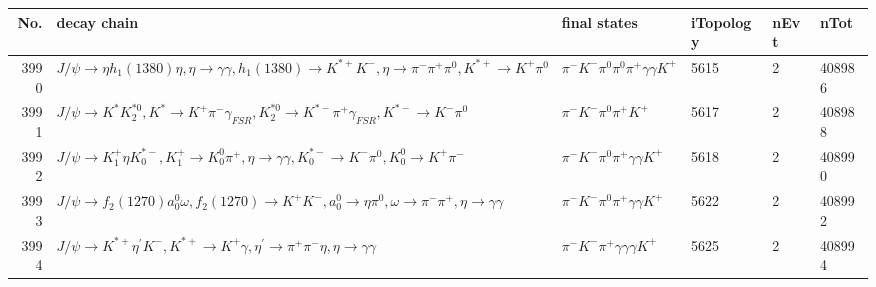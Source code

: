 \begin{table}[htbp] 
\begin{center}
\begin{small}
\begin{tabular}{rlllll}\hline\hline
 No. & decay chain & final states &  iTopology & nEvt & nTot \\\hline
3990&$J/\psi       \rightarrow \eta          h_{1}(1380)    \eta          , \eta           \rightarrow \gamma       \gamma       , h_{1}(1380)     \rightarrow K^{*+}         K^{-}          , \eta           \rightarrow \pi^{-}        \pi^{+}        \pi^{0}        , K^{*+}          \rightarrow K^{+}          \pi^{0}        $&$\pi^{-}        K^{-}          \pi^{0}        \pi^{0}        \pi^{+}        \gamma       \gamma       K^{+}          $& 5615&    2&408986\\
3991&$J/\psi       \rightarrow K^{*}          K_2^{*0}       , K^{*}           \rightarrow K^{+}          \pi^{-}        \gamma_{FSR} , K_2^{*0}        \rightarrow K^{*-}         \pi^{+}        \gamma_{FSR} , K^{*-}          \rightarrow K^{-}          \pi^{0}        $&$\pi^{-}        K^{-}          \pi^{0}        \pi^{+}        K^{+}          $& 5617&    2&408988\\
3992&$J/\psi       \rightarrow K_1^{+}        \eta          K_{0}^{*-}     , K_1^{+}         \rightarrow K_0^{0}        \pi^{+}        , \eta           \rightarrow \gamma       \gamma       , K_{0}^{*-}      \rightarrow K^{-}          \pi^{0}        , K_0^{0}         \rightarrow K^{+}          \pi^{-}        $&$\pi^{-}        K^{-}          \pi^{0}        \pi^{+}        \gamma       \gamma       K^{+}          $& 5618&    2&408990\\
3993&$J/\psi       \rightarrow f_{2}(1270)    a_{0}^{0}      \omega         , f_{2}(1270)     \rightarrow K^{+}          K^{-}          , a_{0}^{0}       \rightarrow \eta          \pi^{0}        , \omega          \rightarrow \pi^{-}        \pi^{+}        , \eta           \rightarrow \gamma       \gamma       $&$\pi^{-}        K^{-}          \pi^{0}        \pi^{+}        \gamma       \gamma       K^{+}          $& 5622&    2&408992\\
3994&$J/\psi       \rightarrow K^{*+}         \eta^{\prime} K^{-}          , K^{*+}          \rightarrow K^{+}          \gamma       , \eta^{\prime}  \rightarrow \pi^{+}        \pi^{-}        \eta          , \eta           \rightarrow \gamma       \gamma       $&$\pi^{-}        K^{-}          \pi^{+}        \gamma       \gamma       \gamma       K^{+}          $& 5625&    2&408994\\

\end{tabular}
\end{small}
\end{center}
\end{table}
